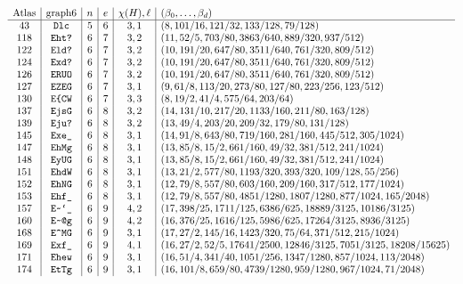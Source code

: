 \documentclass[11pt]{article}
\begin{document}
\scriptsize
\[
\begin{array}{c|c|c|c|c|l}
\text{Atlas}&\text{graph6}&n&e&\chi(H),\ell&(\beta_0,\ldots,\beta_d)\\ \hline
43&\texttt{Dlc}&5&6&3,1&(8,101/16,121/32,133/128,79/128)\\
118&\texttt{Eht?}&6&7&3,2&(11,52/5,703/80,3863/640,889/320,937/512)\\
122&\texttt{Eld?}&6&7&3,2&(10,191/20,647/80,3511/640,761/320,809/512)\\
124&\texttt{Exd?}&6&7&3,2&(10,191/20,647/80,3511/640,761/320,809/512)\\
126&\texttt{ERUO}&6&7&3,2&(10,191/20,647/80,3511/640,761/320,809/512)\\
127&\texttt{EZEG}&6&7&3,1&(9,61/8,113/20,273/80,127/80,223/256,123/512)\\
130&\texttt{E\char`\{CW}&6&7&3,3&(8,19/2,41/4,575/64,203/64)\\
137&\texttt{EjsG}&6&8&3,2&(14,131/10,217/20,1133/160,211/80,163/128)\\
139&\texttt{Eju?}&6&8&3,2&(13,49/4,203/20,209/32,179/80,131/128)\\
145&\texttt{Exe\_}&6&8&3,1&(14,91/8,643/80,719/160,281/160,445/512,305/1024)\\
147&\texttt{EhMg}&6&8&3,1&(13,85/8,15/2,661/160,49/32,381/512,241/1024)\\
148&\texttt{EyUG}&6&8&3,1&(13,85/8,15/2,661/160,49/32,381/512,241/1024)\\
151&\texttt{EhdW}&6&8&3,1&(13,21/2,577/80,1193/320,393/320,109/128,55/256)\\
152&\texttt{EhNG}&6&8&3,1&(12,79/8,557/80,603/160,209/160,317/512,177/1024)\\
153&\texttt{Ehf\_}&6&8&3,1&(12,79/8,557/80,4851/1280,1807/1280,877/1024,165/2048)\\
157&\texttt{E\char`\~`\_}&6&9&4,2&(17,398/25,1711/125,6386/625,18889/3125,10186/3125)\\
160&\texttt{E\char`\~@g}&6&9&4,2&(16,376/25,1616/125,5986/625,17264/3125,8936/3125)\\
168&\texttt{E\char`\^MG}&6&9&3,1&(17,27/2,145/16,1423/320,75/64,371/512,215/1024)\\
169&\texttt{Exf\_}&6&9&4,1&(16,27/2,52/5,17641/2500,12846/3125,7051/3125,18208/15625)\\
171&\texttt{Ehew}&6&9&3,1&(16,51/4,341/40,1051/256,1347/1280,857/1024,113/2048)\\
174&\texttt{EtTg}&6&9&3,1&(16,101/8,659/80,4739/1280,959/1280,967/1024,71/2048)\\

\end{array}\]
\end{document}
